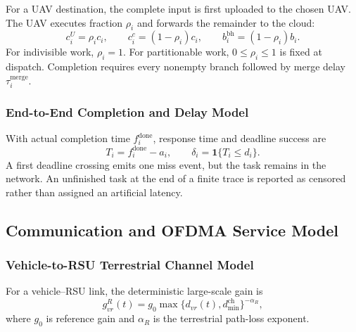 \documentclass[journal]{IEEEtran}
\begin{document}
For a UAV destination, the complete input is first uploaded to the
chosen UAV.  The UAV executes fraction $\rho_i$ and forwards the
remainder to the cloud:
\begin{equation}
c_i^U=\rho_i c_i,\qquad
c_i^c=(1-\rho_i)c_i,\qquad
b_i^{\mathrm{bh}}=(1-\rho_i)b_i.
\label{eq:split}
\end{equation}
For indivisible work, $\rho_i=1$.  For partitionable work,
$0\le\rho_i\le1$ is fixed at dispatch.  Completion requires every
nonempty branch followed by merge delay $\tau_i^{\mathrm{merge}}$.

\subsubsection{End-to-End Completion and Delay Model}
With actual completion time $f_i^{\mathrm{done}}$, response time and
deadline success are
\begin{equation}
T_i=f_i^{\mathrm{done}}-a_i,\qquad
\delta_i=\mathbf 1\{T_i\le d_i\}.
\label{eq:actual_latency}
\end{equation}
A first deadline crossing emits one miss event, but the task remains in
the network.  An unfinished task at the end of a finite trace is
reported as censored rather than assigned an artificial latency.

\subsection{Communication and OFDMA Service Model}
\subsubsection{Vehicle-to-RSU Terrestrial Channel Model}
For a vehicle--RSU link, the deterministic large-scale gain is
\begin{equation}
g_{vr}^{R}(t)=g_0
\max\{d_{vr}(t),d_{\min}^{\mathrm{ch}}\}^{-\alpha_R},
\label{eq:rsu_gain}
\end{equation}
where $g_0$ is reference gain and $\alpha_R$ is the terrestrial
path-loss exponent.
\end{document}
